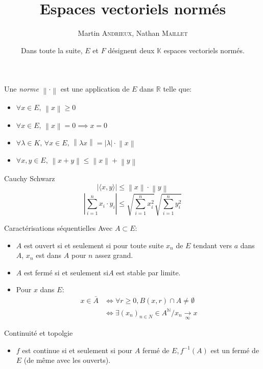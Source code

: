 \documentclass[french, a4paper, 11pt, twocolumn]{article}
\title{Espaces vectoriels normés}
\author{Martin \textsc{Andrieux}, Nathan \textsc{Maillet}}
\date{Dans toute la suite, \(E\) et \(F\) désignent deux \(\mathbb{K}\) espaces vectoriels normés.}
\newcommand{\ssi}{si et seulement si\xspace}		%
\newcommand{\norme}[1]{\left\| #1\right\|}
\newcommand{\abs}[1]{\left\lvert #1\right\rvert}
\newcommand{\limit}[1]{\underset{#1}{\rightarrow}}  %
\newcommand{\N}{\mathbb{N}}   %
\newcommand{\R}{\mathbb{R}}   %
\begin{document}
\maketitle

\begin{definition}
  Une \emph{norme} \(\norme{\cdot}\) est une application de \(E\) dans \(\R\) telle que:
  \begin{itemize}[label=\(\bullet\)]
    \item \(\forall x\in E,\,\norme{x}\geqslant 0\)
    \item \(\forall x\in E,\,\norme{x}=0\implies x=0\)
    \item \(\forall\lambda\in K,\,\forall x\in E,\, \norme{\lambda x}=\abs{\lambda} \cdot \norme{x}\)
    \item \(\forall x,y\in E,\, \norme{x+y}\leqslant\norme{x}+\norme{y}\)
  \end{itemize}
\end{definition}

\begin{theoreme}{Cauchy Schwarz}
  \[\left\lvert \langle x,y\rangle\right\rvert\leqslant\norme{x}\cdot\norme{y}\]
  \tcblower
  \[\abs{\sum_{i=1}^n x_{i}\cdot y_{i}}\leqslant \sqrt{\sum_{i=1}^n x_{i}^{2}}\sqrt{\sum_{i=1}^n y_{i}^{2}}\]
\end{theoreme}

\begin{theoreme}{Caractérisations séquentielles}
    Avec \(A \subset E\):
    \begin{itemize}[label=\(\bullet\)]
        \item \(A\) est ouvert \ssi pour toute suite \(x_{n}\) de \(E\) tendant vers \(a\) dans \(A\), \(x_{n}\) est dans \(A\) pour \(n\) assez grand.
        \item \(A\) est fermé \ssi \(A\) est stable par limite.
        \item Pour \(x\) dans \(E\):
        \begin{align*} 
            x \in \bar{A} & \iff \forall r \geq 0, B(x,r) \cap A \neq \emptyset \\
                          & \iff \exists {(x_n)}_{n\in N} \in A^{\N} / x_n \limit{\infty} x
        \end{align*}
    \end{itemize}
\end{theoreme}

\begin{theoreme}{Continuité et topolgie}
    \begin{itemize}[label=\(\bullet\)]
        \item \(f\) est continue \ssi pour \(A\) fermé de \(E\),\(\, f^{-1}(A)\) est un fermé de \(E\) (de même avec les ouverts).
    \end{itemize}
\end{theoreme}
\end{document}
